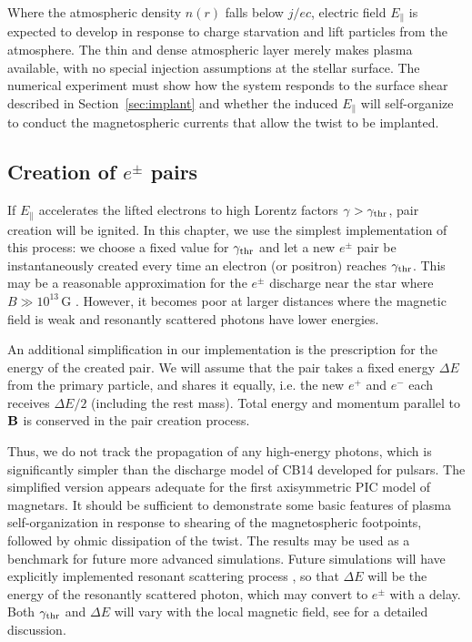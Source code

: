 Where the atmospheric density $n(r)$ falls below $j/ec$, electric field
$E_\parallel$ is expected to develop in response to charge starvation and lift
particles from the atmosphere. The thin and dense atmospheric layer merely makes
plasma available, with no special injection assumptions at the stellar surface.
The numerical experiment must show how the system responds to the surface shear
described in Section~\ref{sec:implant} and whether the induced $E_\parallel$
will self-organize to conduct the magnetospheric currents that allow the twist
to be implanted.

\subsection{Creation of $e^\pm$ pairs}
\label{sec:pairs}

If $E_\parallel$ accelerates the lifted electrons to high Lorentz factors
$\gamma>\gamma_{\rm thr}$, pair creation will be ignited. In this chapter, we use the
simplest implementation of this process: we choose a fixed value for $\gamma_{\rm thr}$ and
let a new $e^\pm$ pair be instantaneously created every time an electron (or
positron) reaches $\gamma_{\rm thr}$. This may be a reasonable approximation for the
$e^\pm$ discharge near the star where $B\gg 10^{13}\,\mathrm{G}$
\citep{beloborodov_mechanism_2013}. However, it becomes poor at larger distances where
the magnetic field is weak and resonantly scattered photons have lower energies.

An additional simplification in our implementation is the
prescription for the energy of the created pair. We will assume that the pair takes a
fixed energy $\Delta E$ from the primary particle, and shares it equally, i.e. the new
$e^+$ and $e^-$ each receives $\Delta E/2$ (including the rest mass).
Total energy and momentum parallel to ${\mathbf B}$ is conserved in the pair creation process.

Thus, we do not track the propagation of any high-energy photons, which is
significantly simpler than the discharge model of CB14 developed for pulsars.
The simplified version appears adequate for the first axisymmetric PIC model of
magnetars. It should be sufficient to demonstrate some basic features of plasma
self-organization in response to shearing of the magnetospheric footpoints,
followed by ohmic dissipation of the twist. The results may be used as a
benchmark for future more advanced simulations. Future simulations will have
explicitly implemented
resonant scattering process
, so that $\Delta E$ will be the energy of
the resonantly scattered photon, which may convert to $e^\pm$ with a delay. Both
$\gamma_{\rm thr}$ and $\Delta E$ will vary with the local magnetic field, see
\citet{beloborodov_mechanism_2013}
for a detailed discussion.


